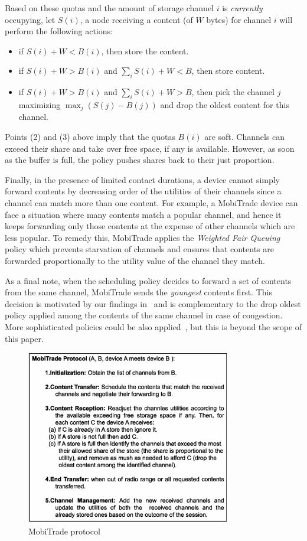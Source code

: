 Based on these quotas and the amount of storage channel $i$ is \emph{currently} occupying, let $S(i)$, a node receiving a content (of $W$ bytes) for channel $i$ will perform the following actions:
\begin{itemize}
\item if $S(i) + W < B(i)$, then store the content.
\item if $S(i) + W > B(i)$ and $\sum_{i} S(i) + W < B$, then store content.
\item if $S(i) + W > B(i)$ and $\sum_{i} S(i) + W > B$, then pick the channel $j$ maximizing $\max_{j} (S(j) - B(j))$ and drop the oldest content for this channel.
\end{itemize}
Points (2) and (3) above imply that the quotas $B(i)$ are soft. Channels can exceed their share and take over free space, if any is available. However, as soon as the buffer is full, the policy pushes shares back to their just proportion.

Finally, in the presence of limited contact durations, a device cannot simply forward contents by decreasing order of the utilities of their channels since a channel can match more than one content. For example, a MobiTrade device can face a situation where many contents match a popular channel, and hence it keeps forwarding only those contents at the expense of other channels which are less popular. To remedy this, MobiTrade applies the \emph{Weighted Fair Queuing} policy which prevents starvation of channels and ensures that contents are forwarded proportionally to the utility value of the channel they match. 

As a final note, when the scheduling policy decides to forward a set of contents from the same channel, MobiTrade sends the \emph{youngest} contents first. This decision is motivated by our findings in~\cite{TMC:Report} and is complementary to the drop oldest policy applied among the contents of the same channel in case of congestion. More sophisticated policies could be also applied~\cite{TMC:Report}, but this is beyond the scope of this paper.

\begin{figure}[!h]
\centering
\includegraphics[width=3.5in,height=3in]{Chapitre5/MobiTrade-Protocol.eps}
\vspace{-0.1in}
\caption{MobiTrade protocol}
\label{protocol}
\vspace{-0.1in}
\end{figure}

